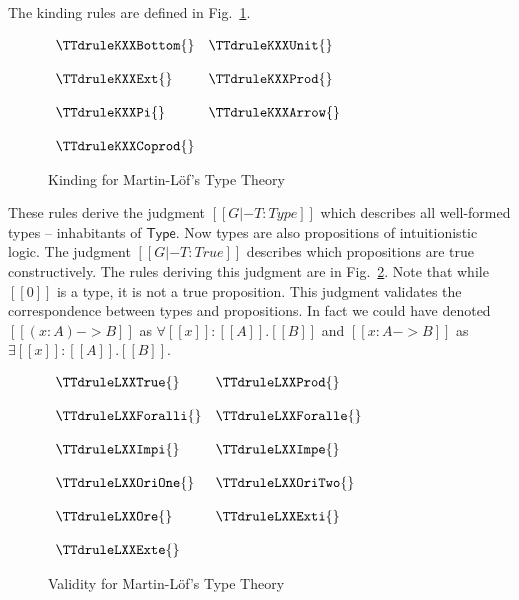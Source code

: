 The kinding rules are defined in Fig.~\ref{fig:lof_kinding}.
\begin{figure}
  \begin{center}
    \begin{math}
      \begin{array}{lll}
        \TTdruleKXXBottom{} & \TTdruleKXXUnit{}\\
        &\\
        \TTdruleKXXExt{} & \TTdruleKXXProd{}\\
        &\\
        \TTdruleKXXPi{} & \TTdruleKXXArrow{}\\
        &\\
        \TTdruleKXXCoprod{}
      \end{array}
    \end{math}
  \end{center}
  \caption{Kinding for Martin-L\"of's Type Theory}
  \label{fig:lof_kinding}
\end{figure}
These rules derive the judgment $[[G |- T : Type]]$ which describes
all well-formed types -- inhabitants of $\mathsf{Type}$.  Now types
are also propositions of intuitionistic logic.  The judgment $[[G |- T
    : True]]$ describes which propositions are true constructively.
The rules deriving this judgment are in Fig.~\ref{fig:lof_validity}.
Note that while $[[0]]$ is a type, it is not a true proposition.  This
judgment validates the correspondence between types and propositions.
In fact we could have denoted $[[(x:A)->B]]$ as $\forall [[x]]:[[A]].[[B]]$
and $[[{x:A}->B]]$ as $\exists [[x]]:[[A]].[[B]]$. 
\begin{figure}
  \begin{center}
    \begin{math}
      \begin{array}{lll}
        \TTdruleLXXTrue{} & \TTdruleLXXProd{}\\
        &\\
        \TTdruleLXXForalli{} & \TTdruleLXXForalle{}\\
        &\\
        \TTdruleLXXImpi{} & \TTdruleLXXImpe{}\\
        &\\
        \TTdruleLXXOriOne{} & \TTdruleLXXOriTwo{}\\
        &\\
        \TTdruleLXXOre{} & \TTdruleLXXExti{}\\
        &\\
        \TTdruleLXXExte{}
      \end{array}
    \end{math}
  \end{center}
  \caption{Validity for Martin-L\"of's Type Theory}
  \label{fig:lof_validity}
\end{figure}
